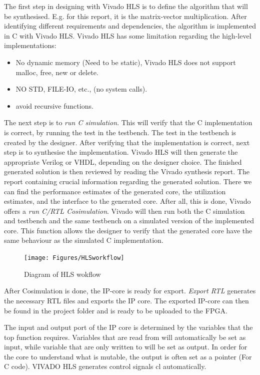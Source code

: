The first step in designing with Vivado HLS is to define the algorithm that will be synthesised. E.g. for this report, it is the matrix-vector multiplication. After identifying different requirements and dependencies, the algorithm is implemented in C with Vivado HLS. Vivado HLS has some limitation regarding the high-level implementations:
\begin{itemize}
\item No dynamic memory (Need to be static), Vivado HLS does not support malloc, free, new or delete. 
\item NO STD, FILE-IO, etc., (no system calls). 
\item avoid recursive functions. 
\end{itemize}



The next step is to \textit{run C simulation}. This will verify that the C implementation is correct, by running the test in the testbench. The test in the testbench is created by the designer. After verifying that the implementation is correct, next step is to synthesise the implementation. Vivado HLS will then generate the appropriate Verilog or VHDL, depending on the designer choice. The finished generated solution is then reviewed by reading the Vivado synthesis report. The report containing crucial information regarding the generated solution. There we can find the performance estimates of the generated core, the utilization estimates, and the interface to the generated core. After all, this is done, Vivado offers a \textit{run C/RTL Cosimulation}. Vivado will then run both the C simulation and testbench and the same testbench on a simulated version of the implemented core. This function allows the designer to verify that the generated core have the same behaviour as the simulated C implementation.

\begin{figure}
\centerline{\texttt{[image: Figures/HLSworkflow]}}
\caption{Diagram of HLS wokflow}
    \label{fig:hlsworkflow}
\end{figure} 
After Cosimulation is done, the IP-core is ready for export. \textit{Export RTL} generates the necessary RTL files and exports the IP core. The exported IP-core can then be found in the project folder and is ready to be uploaded to the FPGA. 

The input and output port of the IP core is determined by the variables that the top function requires. Variables that are read from will automatically be set as input, while variable that are only written to will be set as output. In order for the core to understand what is mutable, the output is often set as a pointer (For C code). VIVADO HLS generates control signals cl automatically. 

